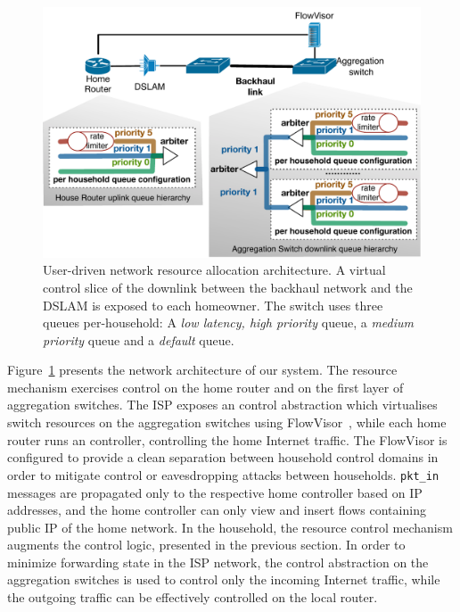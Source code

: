 \begin{figure}
  \centering
  \includegraphics[width=0.7\columnwidth]{queue_design}
  \caption[User-driven QoS architecture]{User-driven network resource allocation architecture. 
    \label{fig:queue_design} A virtual control slice of the downlink between the backhaul
    network and the DSLAM is exposed to each homeowner.  The switch
    uses three queues per-household: A {\it low latency,
      high priority} \/queue, a {\it medium priority} \/queue and a {\it default}
    \/queue.}
\end{figure}

Figure~\ref{fig:queue_design} presents the network architecture of our system.
The resource mechanism exercises control on the home router and on the first layer
of aggregation switches.  The ISP exposes an \of control abstraction which
virtualises switch resources on the aggregation switches using
FlowVisor~, while each home router runs an \of
controller, controlling the home Internet traffic.  The FlowVisor is configured
to provide a clean separation between household control domains in order to
mitigate control or eavesdropping attacks between households. \texttt{pkt\_in}
messages are propagated only to the respective home controller based on IP
addresses, and the home controller can only view and insert flows containing
public IP of the home network\@.   In the household, the resource control mechanism
augments the control logic, presented in the previous section. In order to
minimize forwarding state in the ISP network, the control abstraction on the
aggregation switches is used to control only the incoming Internet traffic,
while the outgoing traffic can be effectively controlled on the local router. 

